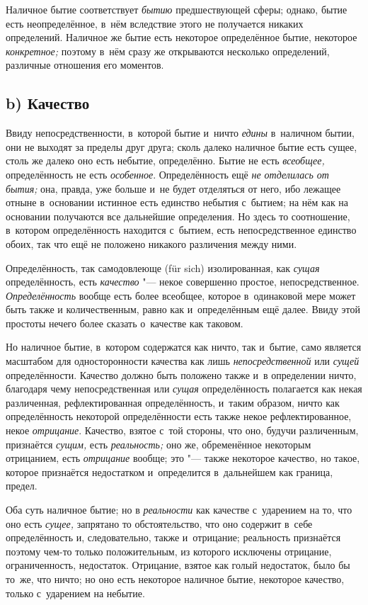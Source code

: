 Наличное бытие соответствует {\em бытию} предшествующей сферы; однако, бытие
есть неопределённое, в~нём вследствие этого не получается никаких определений.
Наличное же бытие есть некоторое определённое бытие, некоторое
{\em конкретное;} поэтому в~нём сразу же открываются несколько определений,
различные отношения его моментов.

\subsection[b) Качество]{b) Качество}

Ввиду непосредственности, в~которой бытие и~ничто
{\em едины} в~наличном бытии, они не выходят за пределы
друг друга; сколь далеко наличное бытие есть сущее, столь же далеко оно
есть небытие, определённо. Бытие не есть {\em всеобщее,}
определённость не есть {\em особенное}. Определённость
ещё {\em не отделилась от бытия;} она, правда, уже
больше и~не будет отделяться от него, ибо лежащее отныне в~основании
истинное есть единство небытия с~бытием; на нём как на основании получаются
все дальнейшие определения. Но здесь то соотношение, в~котором
определённость находится с~бытием, есть непосредственное единство обоих,
так что ещё не положено никакого различения между ними.

Определённость, так самодовлеюще (für sich) изолированная, как
{\em сущая} определённость, есть
{\em качество} "--- некое совершенно простое,
непосредственное. {\em Определённость} вообще есть
более всеобщее, которое в~одинаковой мере может быть также и
количественным, равно как и~определённым ещё далее. Ввиду этой простоты
нечего более сказать о~качестве как таковом.

Но наличное бытие, в~котором содержатся как ничто, так и~бытие, само
является масштабом для односторонности качества как лишь
{\em непосредственной} или {\em сущей} определённости. Качество должно быть
положено также и~в определении ничто, благодаря чему непосредственная или
{\em сущая} определённость полагается как некая
различенная, рефлектированная определённость, и~таким образом, ничто как
определённость некоторой определённости есть также некое рефлектированное,
некое {\em отрицание}. Качество, взятое с~той стороны,
что оно, будучи различенным, признаётся {\em сущим,}
есть {\em реальность;} оно же, обременённое некоторым
отрицанием, есть {\em отрицание} вообще; это "--- также
некоторое качество, но такое, которое признаётся недостатком и~определится
в~дальнейшем как граница, предел.

Оба суть наличное бытие; но в {\em реальности} как качестве с~ударением на то,
что оно есть {\em сущее,} запрятано то обстоятельство, что оно содержит в~себе
определённость и, следовательно, также и~отрицание; реальность признаётся
поэтому чем-то только положительным, из которого исключены отрицание,
ограниченность, недостаток. Отрицание, взятое как голый недостаток, было бы
то~же, что ничто; но оно есть некоторое наличное бытие, некоторое качество,
только с~ударением на небытие.

